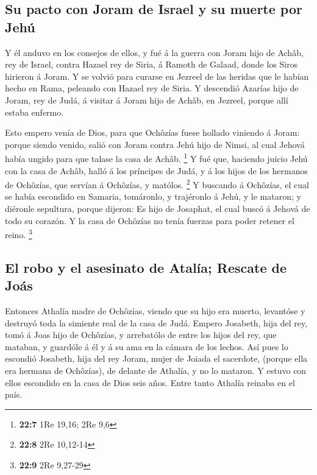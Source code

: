 \hypertarget{su-pacto-con-joram-de-israel-y-su-muerte-por-jehuxfa}{%
\subsection{Su pacto con Joram de Israel y su muerte por
Jehú}\label{su-pacto-con-joram-de-israel-y-su-muerte-por-jehuxfa}}

 Y él anduvo en los consejos de ellos, y fué á la guerra con
Joram hijo de Achâb, rey de Israel, contra Hazael rey de Siria, á Ramoth
de Galaad, donde los Siros hirieron á Joram.  Y se volvió
para curarse en Jezreel de las heridas que le habían hecho en Rama,
peleando con Hazael rey de Siria. Y descendió Azarías hijo de Joram, rey
de Judá, á visitar á Joram hijo de Achâb, en Jezreel, porque allí estaba
enfermo.

 Esto empero venía de Dios, para que Ochôzías fuese hollado
viniendo á Joram: porque siendo venido, salió con Joram contra Jehú hijo
de Nimsi, al cual Jehová había ungido para que talase la casa de Achâb.
\footnote{\textbf{22:7} 1Re 19,16; 2Re 9,6}  Y fué que,
haciendo juicio Jehú con la casa de Achâb, halló á los príncipes de
Judá, y á los hijos de los hermanos de Ochôzías, que servían á Ochôzías,
y matólos. \footnote{\textbf{22:8} 2Re 10,12-14}  Y buscando
á Ochôzías, el cual se había escondido en Samaria, tomáronlo, y
trajéronlo á Jehú, y le mataron; y diéronle sepultura, porque dijeron:
Es hijo de Josaphat, el cual buscó á Jehová de todo su corazón. Y la
casa de Ochôzías no tenía fuerzas para poder retener el reino.
\footnote{\textbf{22:9} 2Re 9,27-29}

\hypertarget{el-robo-y-el-asesinato-de-ataluxeda-rescate-de-jouxe1s}{%
\subsection{El robo y el asesinato de Atalía; Rescate de
Joás}\label{el-robo-y-el-asesinato-de-ataluxeda-rescate-de-jouxe1s}}

 Entonces Athalía madre de Ochôzías, viendo que su hijo era
muerto, levantóse y destruyó toda la simiente real de la casa de Judá.
 Empero Josabeth, hija del rey, tomó á Joas hijo de
Ochôzías, y arrebatólo de entre los hijos del rey, que mataban, y
guardóle á él y á su ama en la cámara de los lechos. Así pues lo
escondió Josabeth, hija del rey Joram, mujer de Joiada el sacerdote,
(porque ella era hermana de Ochôzías), de delante de Athalía, y no lo
mataron.  Y estuvo con ellos escondido en la casa de Dios
seis años. Entre tanto Athalía reinaba en el país.

